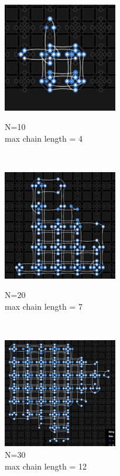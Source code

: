 \documentclass[oneside,a4paper]{article}
\begin{document}
\begin{figure}[htp]
\begin{minipage}[b]{4.5cm}

\includegraphics[width=5cm]{LaTeXTemplate/Images/2000Qfirst10.png}
\caption{N=10\\max chain length = 4}
\end{minipage}
\ \hspace{2mm} \hspace{2mm} \
\begin{minipage}[b]{4.5cm}

\includegraphics[width=5cm]{LaTeXTemplate/Images/2000Qfirst20.png}
\caption{N=20\\max chain length = 7}
\end{minipage}
\ \hspace{2mm} \hspace{2mm} \
\begin{minipage}[b]{4.5cm}
\centering
\includegraphics[width=5cm]{LaTeXTemplate/Images/2000Qfirst30.png}
\caption{N=30\\max chain length = 12}
\end{minipage}
\end{figure}
\end{document}
